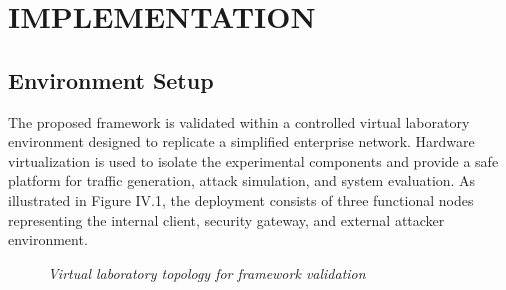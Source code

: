 \documentclass[14pt, a4paper, oneside]{report}
\begin{document}
\chapter{IMPLEMENTATION}
\label{chapt:implementation}
\section{Environment Setup}
\label{sec:experimental_environment}

The proposed framework is validated within a controlled virtual laboratory environment designed to replicate a simplified enterprise network. Hardware virtualization is used to isolate the experimental components and provide a safe platform for traffic generation, attack simulation, and system evaluation. As illustrated in Figure IV.1, the deployment consists of three functional nodes representing the internal client, security gateway, and external attacker environment.

\begin{figure}[htbp]
\centering
{}
\caption{\textit{Virtual laboratory topology for framework validation}}
\label{fig:lab_topology}
\end{figure}
\end{document}
